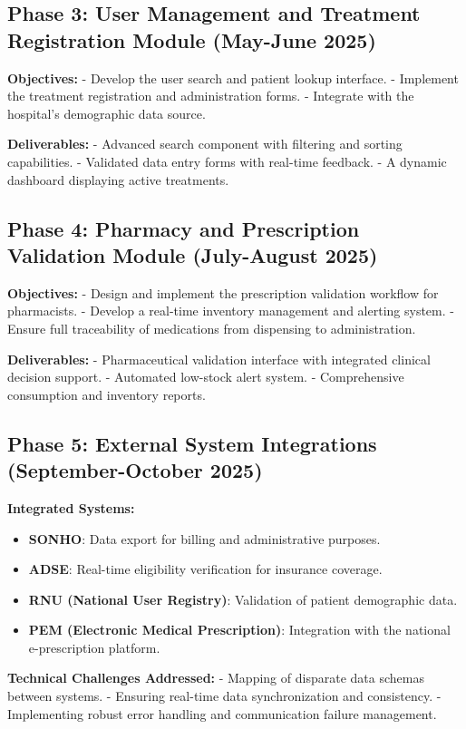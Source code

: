 \subsection{Phase 3: User Management and Treatment Registration Module (May-June 2025)}

\textbf{Objectives:}
- Develop the user search and patient lookup interface.
- Implement the treatment registration and administration forms.
- Integrate with the hospital's demographic data source.

\textbf{Deliverables:}
- Advanced search component with filtering and sorting capabilities.
- Validated data entry forms with real-time feedback.
- A dynamic dashboard displaying active treatments.

\subsection{Phase 4: Pharmacy and Prescription Validation Module (July-August 2025)}

\textbf{Objectives:}
- Design and implement the prescription validation workflow for pharmacists.
- Develop a real-time inventory management and alerting system.
- Ensure full traceability of medications from dispensing to administration.

\textbf{Deliverables:}
- Pharmaceutical validation interface with integrated clinical decision support.
- Automated low-stock alert system.
- Comprehensive consumption and inventory reports.

\subsection{Phase 5: External System Integrations (September-October 2025)}

\textbf{Integrated Systems:}
\begin{itemize}
    \item \textbf{SONHO}: Data export for billing and administrative purposes.
    \item \textbf{ADSE}: Real-time eligibility verification for insurance coverage.
    \item \textbf{RNU (National User Registry)}: Validation of patient demographic data.
    \item \textbf{PEM (Electronic Medical Prescription)}: Integration with the national e-prescription platform.
\end{itemize}

\textbf{Technical Challenges Addressed:}
- Mapping of disparate data schemas between systems.
- Ensuring real-time data synchronization and consistency.
- Implementing robust error handling and communication failure management.

